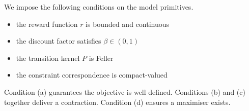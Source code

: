 We impose the following conditions on the model primitives.

\begin{itemize}
    \item[(a)] the reward function $r$ is bounded and continuous
    \item[(b)] the discount factor satisfies $\beta \in (0, 1)$
    \item[(c)] the transition kernel $P$ is Feller
    \item[(d)] the constraint correspondence is compact-valued
\end{itemize}

Condition (a) guarantees the objective is well defined. Conditions (b)
and (c) together deliver a contraction. Condition (d) ensures a maximiser
exists.
